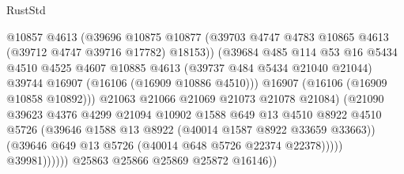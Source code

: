 \begin{lexlean}{RustStd}
\begin{coremodule}
                                      @10857
                                      @4613
                                      (@39696
                                        @10875
                                        @10877
                                        (@39703
                                          @4747
                                          @4783
                                          @10865
                                          @4613
                                          (@39712 @4747 @39716 @17782)
                                          @18153))
                                      (@39684
                                        @485
                                        @114
                                        @53
                                        @16
                                        @5434
                                        @4510
                                        @4525
                                        @4607
                                        @10885
                                        @4613
                                        (@39737 @484 @5434 @21040 @21044)
                                        @39744
                                        @16907
                                        (@16106 (@16909 @10886 @4510)))
                                      @16907
                                      (@16106 (@16909 @10858 @10892)))
                                    @21063
                                    @21066
                                    @21069
                                    @21073
                                    @21078
                                    @21084)
                                  (@21090
                                    @39623
                                    @4376
                                    @4299
                                    @21094
                                    @10902
                                    @1588
                                    @649
                                    @13
                                    @4510
                                    @8922
                                    @4510
                                    @5726
                                    (@39646 @1588 @13 @8922 (@40014 @1587 @8922 @33659 @33663))
                                    (@39646 @649 @13 @5726 (@40014 @648 @5726 @22374 @22378)))))
                              @39981))))))
                  @25863
                  @25866
                  @25869
                  @25872
                  @16146))

\end{coremodule}
\end{lexlean}
